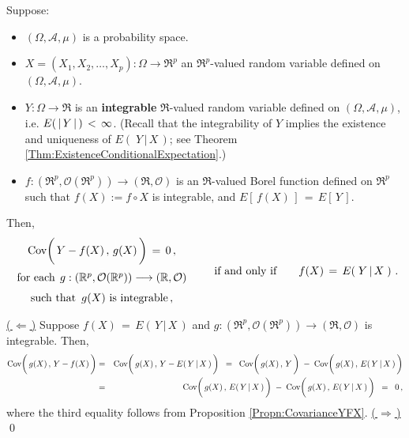 \begin{theorem}
\mbox{}
\vskip 0.2cm
\noindent
Suppose:
\begin{itemize}
\item
	$(\Omega,\mathcal{A},\mu)$ is a probability space.
\item
	$X = (X_{1}, X_{2}, \ldots, X_{p}) : \Omega \longrightarrow \Re^{p}$ an $\Re^{p}$-valued random variable
	defined on $(\Omega,\mathcal{A},\mu)$.
\item
	$Y : \Omega \longrightarrow \Re$ is an \textbf{\color{red}integrable} $\Re$-valued random variable
	defined on $(\Omega,\mathcal{A},\mu)$,
	i.e. $E(\,\vert\,\overset{{\color{white}.}}{Y}\,\vert\,)\,<\,\infty$.
	\vskip 0.01cm
	(Recall that the integrability of $Y$ implies the existence and uniqueness of $E\!\left(\;Y\,\vert\,X\,\right)$;
	see Theorem \ref{Thm:ExistenceConditionalExpectation}.)
\item
	$f : (\Re^{p},\mathcal{O}(\Re^{p})) \longrightarrow (\Re,\mathcal{O})$ is an $\Re$-valued Borel function
	defined on $\Re^{p}$ such that $f(X) := f\circ X$ is integrable, and $E\!\left[\,f(X)\,\right] \,=\, E\!\left[\,Y\,\right]$.
\end{itemize}
Then,
\begin{equation*}
	\begin{array}{c}
	\Cov\!\left(\,Y-f(X)\,,\,\overset{{\color{white}\vert}}{g}(X)\,\right) \,=\, 0\,,
	\\
	\overset{{\color{white}-}}{\textnormal{for each}\;\, g : (\Re^{p},\mathcal{O}(\Re^{p}))\longrightarrow (\Re,\mathcal{O})}
	\\
	\overset{{\color{white}-}}{\textnormal{such that \,$g(X)$ is integrable}}
	\,,
	\end{array}
	\quad\quad\textnormal{if and only if}\quad\quad
	f(X) \,=\, E\!\left(\;Y\,\vert\,X\;\right)\,.
\end{equation*}
\end{theorem}
\proof
\vskip 0.1cm
\noindent
\underline{(\,$\Longleftarrow$\,)}\quad
Suppose $f(X) \,=\, E\!\left(\,Y\,\vert\,X\,\right)$ and
$g : (\Re^{p},\mathcal{O}(\Re^{p}))\longrightarrow (\Re,\mathcal{O})$
is integrable.
Then,
\begin{eqnarray*}
\Cov\!\left(\,\overset{{\color{white}\vert}}{g}(X)\,,\,Y-f(X)\,\right)
&=&
	\Cov\!\left(\,\overset{{\color{white}\vert}}{g}(X)\,,\,Y-E\!\left(\,Y\,\vert\,X\,\right)\,\right)
\;\;=\;\;
	\Cov\!\left(\,\overset{{\color{white}\vert}}{g}(X)\,,\,Y\,\right)
	\; - \;
	\Cov\!\left(\,\overset{{\color{white}\vert}}{g}(X)\,,\,E\!\left(\,Y\,\vert\,X\,\right)\,\right)
\\
&=&
	\Cov\!\left(\,\overset{{\color{white}\vert}}{g}(X)\,,\,E\!\left(\,Y\,\vert\,X\,\right)\,\right)
	\; - \;
	\Cov\!\left(\,\overset{{\color{white}\vert}}{g}(X)\,,\,E\!\left(\,Y\,\vert\,X\,\right)\,\right)
\;\;=\;\;
	0\,,
\end{eqnarray*}
where the third equality follows from Proposition \ref{Propn:CovarianceYFX}.
\vskip 0.3cm
\noindent
\underline{(\,$\Longrightarrow$\,)}\quad
\qed

